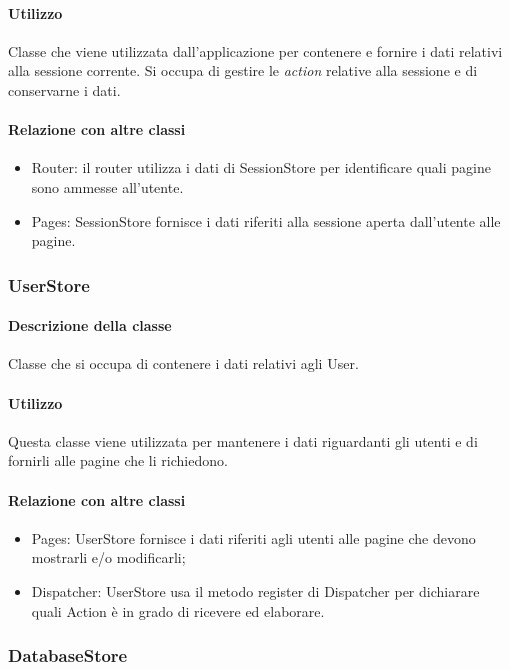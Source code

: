 \paragraph*{Utilizzo}
Classe che viene utilizzata dall'applicazione per contenere e fornire i dati relativi alla sessione corrente. Si occupa di gestire le \textit{action} relative alla sessione e di conservarne i dati.
\paragraph*{Relazione con altre classi}
\begin{itemize}
\item Router: il router utilizza i dati di SessionStore per identificare quali pagine sono ammesse all'utente.
\item Pages: SessionStore fornisce i dati riferiti alla sessione aperta dall'utente alle pagine.
\end{itemize}

\subsubsection{UserStore}
\paragraph*{Descrizione della classe}
Classe che si occupa di contenere i dati relativi agli User.
\paragraph*{Utilizzo}
Questa classe viene utilizzata per mantenere i dati riguardanti gli utenti e di fornirli alle pagine che li richiedono.
\paragraph*{Relazione con altre classi}
\begin{itemize}
\item Pages: UserStore fornisce i dati riferiti agli utenti alle pagine che devono mostrarli e/o modificarli;
\item Dispatcher: UserStore usa il metodo register di Dispatcher per dichiarare quali Action è in grado di ricevere ed elaborare.
\end{itemize}

\subsubsection{DatabaseStore}
